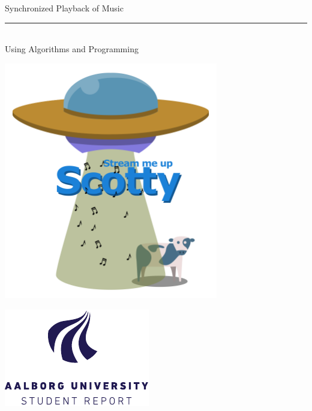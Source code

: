 %
\newcommand{\titlefont}{\sffamily\fontsize{36pt}{0pt}\selectfont}
\newcommand{\subtitlefont}{\sffamily\fontsize{26pt}{0pt}\selectfont}
\newcommand{\smallfont}{\sffamily\fontsize{12pt}{0pt}\selectfont}
\begin{titlepage}
    \noindent%
        \begin{center}
            \titlefont Synchronized Playback of Music\\
            \vspace{0.2cm}
            \rule{90pt}{1pt}\\
            \vspace{0.2cm}
            \subtitlefont Using Algorithms and Programming
        \end{center}
    \null\vfill
    \begin{minipage}{1\textwidth}
        \centering
        \includegraphics[width=0.7\textwidth]{img/scotty_white.png}
    \end{minipage}
    \null\vfill
    \vspace*{1cm}
    \noindent
    \begin{minipage}{0.35\linewidth}
        \begin{flushleft}
        \includegraphics[width=0.8\linewidth]{img/aau_logo_en.pdf}

\end{flushleft}
\end{minipage}
\end{titlepage}
